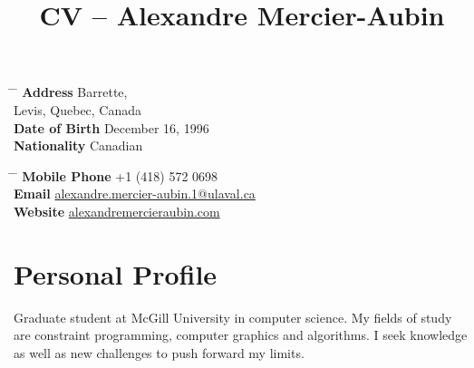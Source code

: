 \documentclass[10pt]{article} %
\begin{document}

\title{CV -- Alexandre Mercier-Aubin} %


\parbox{0.5\textwidth}{ %
\begin{tabbing} %
\hspace{3cm} \= \hspace{4cm} \= \kill %
{\bf Address}  Barrette,\\ %
\> Levis, Quebec, Canada \\ %
{\bf Date of Birth} \> December 16, 1996 \\ %
{\bf Nationality} \> Canadian %
\end{tabbing}}
\hfill %
\parbox{0.5\textwidth}{ %
\begin{tabbing} %
\hspace{3cm} \= \hspace{4cm} \= \kill %
{\bf Mobile Phone} \> +1 (418) 572 0698 \\ %
{\bf Email} \> \href{mailto:alexandre.mercier-aubin.1@ulaval.ca}{alexandre.mercier-aubin.1@ulaval.ca} \\ %
{\bf Website} \> \href{alexandremercieraubin.github.io}{alexandremercieraubin.com} \\
\end{tabbing}}


\section{Personal Profile}

Graduate student at McGill University in computer science. My fields of study are constraint programming, computer graphics and algorithms. I seek knowledge as well as new challenges to push forward my limits.

\end{document}
